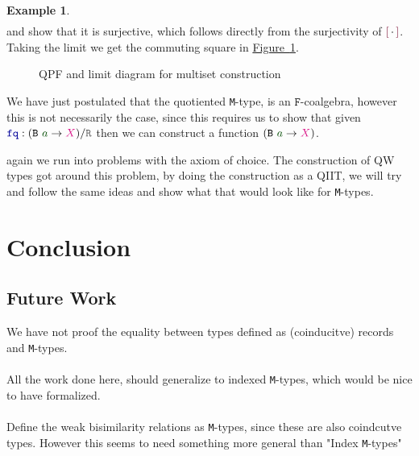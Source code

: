 \documentclass[twoside,11pt,openright]{report}
\theoremstyle{plain} %
\theoremstyle{definition}
\newtheorem{exmp}{Example} %
\theoremstyle{remark}
\newcommand*{\figref}[1]{\hyperref[fig:#1]{Figure~\ref*{fig:#1}}}
\newcommand*{\term}[1]{\textcolor{green!30!black}{#1}} %
\newcommand*{\type}[1]{\textcolor{magenta!90!black}{#1}}
\newcommand*{\relation}[1]{\textcolor{gray!75!black}{\ensuremath{\mathtt{#1}}}}
\newcommand*{\function}[1]{\textcolor{blue!60!black}{\ensuremath{\mathtt{#1}}}}
\newcommand*{\constructor}[1]{\textcolor{purple!60!black}{\ensuremath{\mathtt{#1}}}}
\newcommand*{\typeformer}[1]{\ensuremath{\mathtt{#1}}}
\newcommand*{\functor}[1]{\ensuremath{\mathbf{\mathtt{#1}}}}
\newcommand*{\quotientconstructor}[1]{\constructor{[}\,#1\,\constructor{]}}
\begin{document}
\begin{exmp}
\begin{equation}
\begin{aligned}
    \end{aligned}
  \end{equation}
  and show that it is surjective, which follows directly from the surjectivity of \(\quotientconstructor{{\cdot}}\). Taking the limit we get the commuting square in \figref{QPF-limit-multiset}.
  \begin{figure}[h]
  \centering
  \caption{QPF and limit diagram for multiset construction}
  \label{fig:QPF-limit-multiset}
\end{figure}
\end{exmp}
We have just postulated that the quotiented \texttt{M}-type, is an \(\functor{F}\)-coalgebra, however this is not necessarily the case, since this requires us to show that given \(\function{fq} : (\typeformer{B}~\term{a} \rightarrow \type{X}) / \relation{R}\) then we can construct a function \((\typeformer{B}~\term{a} \rightarrow \type{X})\).

 again we run into problems with the axiom of choice. The construction of QW types got around this problem, by doing the construction as a QIIT, we will try and follow the same ideas and show what that would look like for \texttt{M}-types. 

\chapter{Conclusion}
\label{ch:conclusion}



\section{Future Work}
We have not proof the equality between types defined as (coinducitve) records and \texttt{M}-types.
\\ \\
All the work done here, should generalize to indexed \texttt{M}-types, which would be nice to have formalized.
\\ \\
Define the weak bisimilarity relations as \texttt{M}-types, since these are also coindcutve types. However this seems to need something more general than "Index \texttt{M}-types"
\end{document}
